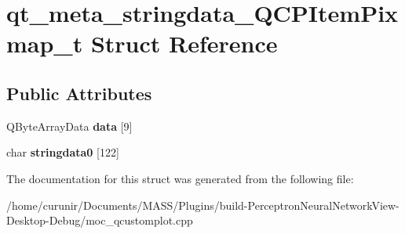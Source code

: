 \hypertarget{structqt__meta__stringdata___q_c_p_item_pixmap__t}{}\section{qt\+\_\+meta\+\_\+stringdata\+\_\+\+Q\+C\+P\+Item\+Pixmap\+\_\+t Struct Reference}
\label{structqt__meta__stringdata___q_c_p_item_pixmap__t}
\subsection*{Public Attributes}
\begin{DoxyCompactItemize}
\item 
Q\+Byte\+Array\+Data {\bfseries data} \mbox{[}9\mbox{]}\hypertarget{structqt__meta__stringdata___q_c_p_item_pixmap__t_aef8aac1ad1d85c743f42d7ad8159bf41}{}\label{structqt__meta__stringdata___q_c_p_item_pixmap__t_aef8aac1ad1d85c743f42d7ad8159bf41}

\item 
char {\bfseries stringdata0} \mbox{[}122\mbox{]}\hypertarget{structqt__meta__stringdata___q_c_p_item_pixmap__t_aea88f01d1b77a98c2d9c3f2c64695c05}{}\label{structqt__meta__stringdata___q_c_p_item_pixmap__t_aea88f01d1b77a98c2d9c3f2c64695c05}

\end{DoxyCompactItemize}


The documentation for this struct was generated from the following file\+:\begin{DoxyCompactItemize}
\item 
/home/curunir/\+Documents/\+M\+A\+S\+S/\+Plugins/build-\/\+Perceptron\+Neural\+Network\+View-\/\+Desktop-\/\+Debug/moc\+\_\+qcustomplot.\+cpp\end{DoxyCompactItemize}
